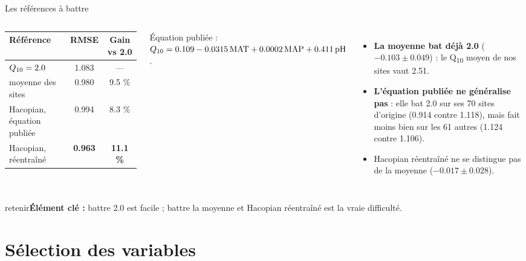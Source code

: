\documentclass[aspectratio=169,10pt]{beamer}
\newcommand{\retenir}[1]{\vfill\begin{beamercolorbox}[sep=5pt,rounded=true]{retenir}\small\textbf{Élément clé :} #1\end{beamercolorbox}}
\newcommand{\Qdix}{Q\textsubscript{10}}
\begin{document}
\begin{frame}{Les références à battre}
  \begin{columns}[c]
      \small
      \begin{tabular}{lcc}
        \toprule
        Référence & RMSE & Gain vs 2.0 \\
        \midrule
        $\Qdix = 2.0$ & 1.083 & --- \\
        moyenne des sites & 0.980 & 9.5 \% \\
        Hacopian, équation publiée & 0.994 & 8.3 \% \\
        Hacopian, réentraîné & \textbf{0.963} & \textbf{11.1 \%} \\
        \bottomrule
      \end{tabular}
      \vspace{0.2cm}

      {\footnotesize Équation publiée : $\Qdix = 0.109 - 0.0315\,\text{MAT} + 0.0002\,\text{MAP} + 0.411\,\text{pH}$.}
      \small
      \begin{itemize}
        \item \textbf{La moyenne bat déjà 2.0} ($-0.103 \pm 0.049$) : le \Qdix{} moyen de nos sites vaut 2.51.
        \item \textbf{L'équation publiée ne généralise pas} : elle bat 2.0 sur ses 70 sites d'origine (0.914 contre 1.118), mais fait moins bien sur les 61 autres (1.124 contre 1.106).
        \item Hacopian réentraîné ne se distingue pas de la moyenne ($-0.017 \pm 0.028$).
      \end{itemize}
  \end{columns}
  \retenir{battre 2.0 est facile ; battre la moyenne et Hacopian réentraîné est la vraie difficulté.}
\end{frame}

\section{Sélection des variables}
\end{document}

